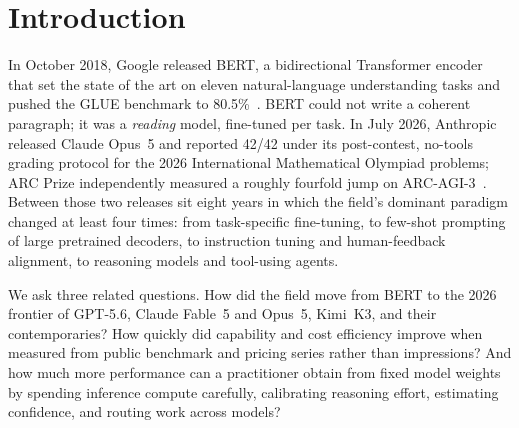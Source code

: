 \section{Introduction}\label{sec:intro}

In October 2018, Google released BERT, a bidirectional Transformer encoder that
set the state of the art on eleven natural-language understanding tasks and
pushed the GLUE benchmark to 80.5\%~\cite{devlin2019bert}. BERT could not write
a coherent paragraph; it was a \emph{reading} model, fine-tuned per task. In
July 2026, Anthropic released Claude Opus~5 and reported 42/42 under its
post-contest, no-tools grading protocol for the 2026 International Mathematical
Olympiad problems; ARC Prize independently measured a roughly fourfold jump on
ARC-AGI-3~\cite{anthropic2026opus5card,arcprize2026opus5}. Between those
two releases sit eight years in which the field's dominant paradigm changed at
least four times: from task-specific fine-tuning, to few-shot prompting of
large pretrained decoders, to instruction tuning and human-feedback alignment,
to reasoning models and tool-using agents.

We ask three related questions. How did the field move from BERT to the
2026 frontier of GPT-5.6, Claude Fable~5 and Opus~5, Kimi~K3, and their
contemporaries? How quickly did capability and cost efficiency improve when
measured from public benchmark and pricing series rather than impressions?
And how much more performance can a practitioner obtain from fixed model
weights by spending inference compute carefully, calibrating reasoning effort,
estimating confidence, and routing work across models?

